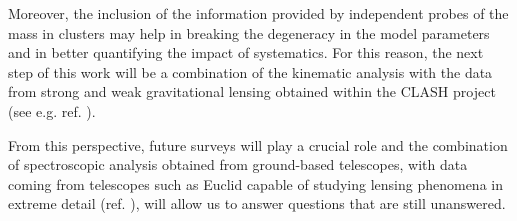 Moreover, the inclusion of the information provided by independent probes of the mass in clusters may help in breaking the degeneracy in the model parameters and in better quantifying the impact of systematics. For this reason, the next step of this work will be a combination of the kinematic analysis with the data from strong and weak gravitational lensing obtained within the CLASH project (see e.g. ref. \cite{Umetsu2016}).

From this perspective, future surveys will play a crucial role and the combination of spectroscopic analysis obtained from ground-based telescopes, with data coming from telescopes such as Euclid capable of studying lensing phenomena in extreme detail (ref. \cite{2025}), will allow us to answer questions that are still unanswered.